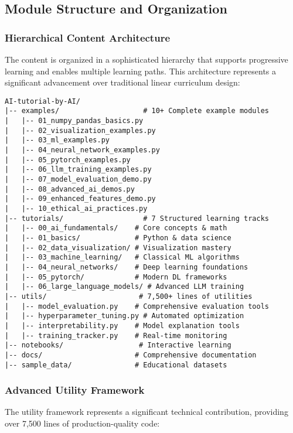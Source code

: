 \subsection{Module Structure and Organization}

\subsubsection{Hierarchical Content Architecture}

The content is organized in a sophisticated hierarchy that supports progressive learning and enables multiple learning paths. This architecture represents a significant advancement over traditional linear curriculum design:

\begin{verbatim}
AI-tutorial-by-AI/
|-- examples/                    # 10+ Complete example modules
|   |-- 01_numpy_pandas_basics.py
|   |-- 02_visualization_examples.py
|   |-- 03_ml_examples.py
|   |-- 04_neural_network_examples.py
|   |-- 05_pytorch_examples.py
|   |-- 06_llm_training_examples.py
|   |-- 07_model_evaluation_demo.py
|   |-- 08_advanced_ai_demos.py
|   |-- 09_enhanced_features_demo.py
|   |-- 10_ethical_ai_practices.py
|-- tutorials/                   # 7 Structured learning tracks
|   |-- 00_ai_fundamentals/    # Core concepts & math
|   |-- 01_basics/             # Python & data science
|   |-- 02_data_visualization/ # Visualization mastery
|   |-- 03_machine_learning/   # Classical ML algorithms
|   |-- 04_neural_networks/    # Deep learning foundations
|   |-- 05_pytorch/            # Modern DL frameworks
|   |-- 06_large_language_models/ # Advanced LLM training
|-- utils/                      # 7,500+ lines of utilities
|   |-- model_evaluation.py    # Comprehensive evaluation tools
|   |-- hyperparameter_tuning.py # Automated optimization
|   |-- interpretability.py    # Model explanation tools
|   |-- training_tracker.py    # Real-time monitoring
|-- notebooks/                  # Interactive learning
|-- docs/                      # Comprehensive documentation
|-- sample_data/               # Educational datasets
\end{verbatim}

\subsubsection{Advanced Utility Framework}

The utility framework represents a significant technical contribution, providing over 7,500 lines of production-quality code:

